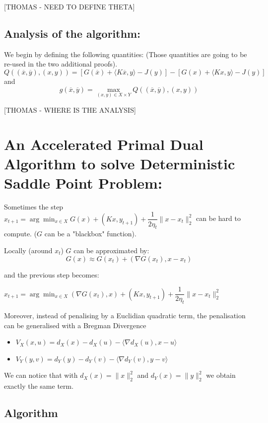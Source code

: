 \documentclass[12pt,reqno]{amsart}
\numberwithin{equation}{section}
\begin{document}
[THOMAS - NEED TO DEFINE THETA]

\subsection{ Analysis of the algorithm: }

We begin by defining the following quantities:
(Those quantities are going to be re-used in the two additional proofs).
$$
Q((\overline{x},\overline{y}),(x,y)) = [G(\overline{x}) + \langle K\overline{x},y\rangle - J(y)] - [G(x) + \langle Kx,y\rangle - J(y)]
$$
and
$$
g(\overline{x},\overline{y}) = \max_{(x,y)\in X \times Y} Q((\overline{x},\overline{y}),(x,y))
$$

[THOMAS - WHERE IS THE ANALYSIS]

\section{ An Accelerated Primal Dual Algorithm to solve Deterministic Saddle Point Problem: }


Sometimes the step $x_{t+1} = \arg\min_{x \in X} G(x) + (Kx,y_{t+1}) + \dfrac{1}{2\eta_{t}}\lVert x - x_{t} \rVert_{2}^{2}$ can be hard to compute.
($G$ can be a "blackbox" function).

Locally (around $x_{t}$) $G$ can be approximated by:
$$
G(x) \approx G(x_{t}) + (\nabla G(x_{t}),x - x_{t})
$$

and the previous step becomes:

$x_{t+1} = \arg\min_{x \in X} (\nabla G(x_{t}),x) + (Kx,y_{t+1}) + \dfrac{1}{2\eta_{t}}\lVert x - x_{t} \rVert_{2}^{2}$

Moreover, instead of penalising by a Euclidian quadratic term, the penalisation can be generalised with a Bregman Divergence

\begin{itemize}
\item $V_{X}(x,u) = d_{X}(x) -  d_{X}(u) - \langle \nabla d_{X}(u),x - u \rangle$
\item $V_{Y}(y,v) = d_{Y}(y) -  d_{Y}(v) - \langle \nabla d_{Y}(v),y - v \rangle$
\end{itemize}

We can notice that with $d_{X}(x) = \lVert x \rVert_{2}^{2}$ and $d_{Y}(x) = \lVert y \rVert_{2}^{2}$ we obtain exactly the same term.

\subsection{Algorithm}
\end{document}
